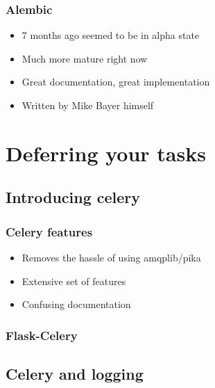 \documentclass[14pt]{beamer}
\begin{document}
\begin{frame}
  \frametitle{Alembic}
  \begin{itemize}
  \item 7 months ago seemed to be in alpha state
  \item Much more mature right now
  \item Great documentation, great implementation
  \item Written by Mike Bayer himself
  \end{itemize}
\end{frame}

\section{Deferring your tasks}

\subsection{Introducing celery}

\begin{frame}
  \frametitle{Celery features}
  \begin{itemize}
  \item Removes the hassle of using amqplib/pika
  \item Extensive set of features
  \item Confusing documentation
  \end{itemize}
\end{frame}

\begin{frame}
  \frametitle{Flask-Celery}
\end{frame}


\subsection{Celery and logging}
\end{document}
